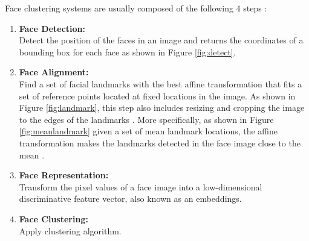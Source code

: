 \documentclass[12pt,english]{article}
\begin{document}
Face clustering systems are usually composed of the following 4 steps \cite{trigueros}: 

\begin{enumerate}
  \item \textbf{Face Detection:}\\ Detect the position of the faces in an image and returns the coordinates of a bounding box for each face as shown in Figure \ref{fig:detect}.
  \item \textbf{Face Alignment:} \\ Find a set of facial landmarks with the best affine transformation that fits a set of reference points located at fixed locations in the image. As shown in Figure \ref{fig:landmark}, this step also includes resizing and cropping the image to the edges of the landmarks \cite{amos}. More specifically, as shown in Figure \ref{fig:meanlandmark} given a set of mean landmark locations, the affine transformation makes the landmarks detected in the face image close to the mean \cite{amos}.
  
  \item \textbf{Face Representation:} \\ Transform the pixel values of a face image into a low-dimensional discriminative feature vector, also known as an embeddings. 
  \item \textbf{Face Clustering:} \\ Apply clustering algorithm.
\end{enumerate} 
 
\end{document}
